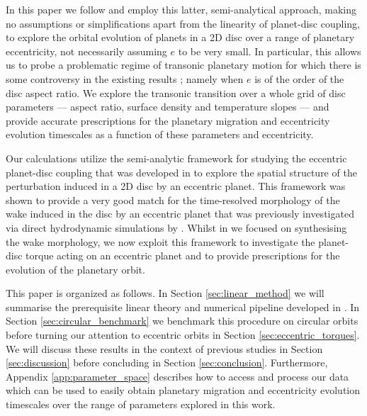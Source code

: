 In this paper we follow \citet{KorycanskyPollack_1993} and employ this latter, semi-analytical approach, making no assumptions or simplifications apart from the linearity of planet-disc coupling, to explore the orbital evolution of planets in a 2D disc over a range of planetary eccentricity, not necessarily assuming $e$ to be very small. In particular, this allows us to probe a problematic regime of transonic planetary motion for which there is some controversy in the existing results \citep{PapaloizouLarwood_2000,CresswellNelson_2006,IdaEtAl_2020}; namely when $e$ is of the order of the disc aspect ratio. We explore the transonic transition over a whole grid of disc parameters --- aspect ratio, surface density and temperature slopes --- and provide accurate prescriptions for the planetary migration and eccentricity evolution timescales as a function of these parameters and eccentricity. 

Our calculations utilize the semi-analytic framework for studying the eccentric planet-disc coupling that was developed in \citet[][hereafter ]{FairbairnRafikov_2022} to explore the spatial structure of the perturbation induced in a 2D disc by an eccentric planet. This framework was shown to provide a very good match for the time-resolved morphology of the wake induced in the disc by an eccentric planet that was previously investigated via direct hydrodynamic simulations by \citet{ZhuZhang_2022}. Whilst in  we focused on synthesising the wake morphology, we now exploit this framework to investigate the planet-disc torque acting on an eccentric planet and to provide prescriptions for the evolution of the planetary orbit. 

This paper is organized as follows. In Section \ref{sec:linear_method} we will summarise the prerequisite linear theory and numerical pipeline developed in . In Section \ref{sec:circular_benchmark} we benchmark this procedure on circular orbits before turning our attention to eccentric orbits in Section \ref{sec:eccentric_torques}. We will discuss these results in the context of previous studies in Section \ref{sec:discussion} before concluding in Section \ref{sec:conclusion}. Furthermore, Appendix \ref{app:parameter_space} describes how to access and process our data which can be used to easily obtain planetary migration and eccentricity evolution timescales over the range of parameters explored in this work. 














